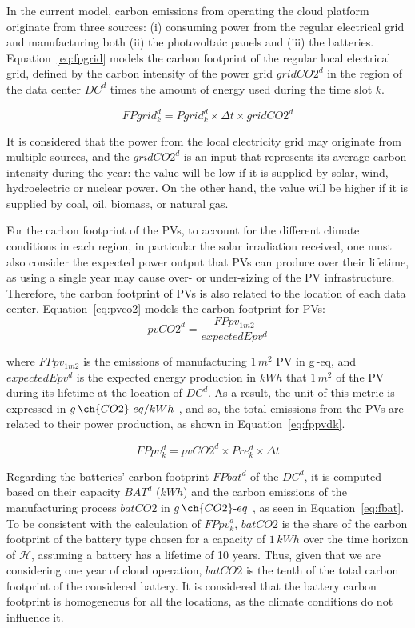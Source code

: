 In the current model, carbon emissions from operating the cloud platform originate from three sources: (i) consuming power from the regular electrical grid and manufacturing both (ii) the photovoltaic panels and (iii) the batteries. Equation~\eqref{eq:fpgrid} models the carbon footprint of the regular local electrical grid, defined by the carbon intensity of the power grid $gridCO2^d$ in the region of the data center $DC^d$  times the amount of energy used during the time slot $k$.

\begin{equation} \label{eq:fpgrid}
FPgrid_k^d = Pgrid_k^d\times \Delta t \times gridCO2^d
\end{equation}

It is considered that the power from the local electricity grid may originate from multiple sources, and the $gridCO2^d$ is an input that represents its average carbon intensity during the year: the value will be low if it is supplied by solar, wind, hydroelectric or nuclear power. On the other hand, the value will be higher if it is supplied by coal, oil, biomass, or natural gas.

For the carbon footprint of the PVs, to account for the different climate conditions in each region, in particular the solar irradiation received, one must also consider the expected power output that PVs can produce over their lifetime, as using a single year may cause over- or under-sizing of the PV infrastructure. Therefore, the carbon footprint of PVs is also related to the location of each data center. Equation~\eqref{eq:pvco2} models the carbon footprint for PVs:
\begin{equation} \label{eq:pvco2}
   pvCO2^d =  \frac{FPpv_{1m2}}{expectedEpv^d} 
\end{equation}

where $FPpv_{1m2}$ is the emissions of manufacturing $1\,m^2$ PV in g\,-eq, and $expectedEpv^d$ is the expected energy production in $kWh$ that $1\,m^2$ of the PV during its lifetime at the location of $DC^d$. As a result, the unit of this metric is expressed in $g\,\ch{CO2}\text{-}eq/kWh$ , and so, the total emissions from the PVs are related to their power production, as shown in Equation~\eqref{eq:fppvdk}.

\begin{equation} \label{eq:fppvdk}
   FPpv^d_k =  pvCO2^d \times Pre_k^d \times \Delta t
\end{equation}


Regarding the batteries' carbon footprint $FPbat^d$ of the $DC^d$, it is computed based on their capacity $BAT^d$ ($kWh$) and the carbon emissions of the manufacturing process $batCO2$ in $g\,\ch{CO2}\text{-}eq$ , as seen in Equation~\eqref{eq:fbat}. To be consistent with the calculation of $FPpv^d_k$, $batCO2$ is the share of the carbon footprint of the battery type chosen for a capacity of $1\,kWh$ over the time horizon of $\mathcal{H}$, assuming a battery has a lifetime of 10 years. Thus, given that we are considering one year of cloud operation, $batCO2$ is the tenth of the total carbon footprint of the considered battery. It is considered that the battery carbon footprint is homogeneous for all the locations, as the climate conditions do not influence it.


